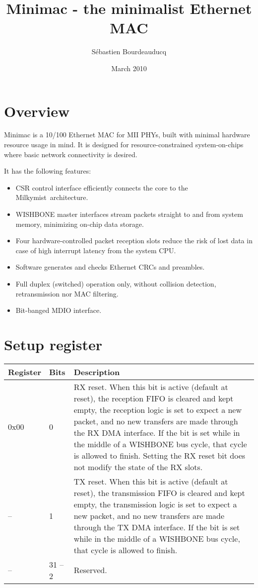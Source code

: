 \documentclass[a4paper,11pt]{article}
\title{Minimac - the minimalist Ethernet MAC}
\author{S\'ebastien Bourdeauducq}
\date{March 2010}
\begin{document}
\setlength{\parindent}{0pt}
\setlength{\parskip}{5pt}
\maketitle{}
\section{Overview}
Minimac is a 10/100 Ethernet MAC for MII PHYs, built with minimal hardware resource usage in mind. It is designed for resource-constrained system-on-chips where basic network connectivity is desired.

It has the following features:
\begin{itemize}
\item CSR control interface efficiently connects the core to the Milkymist\texttrademark~architecture.
\item WISHBONE master interfaces stream packets straight to and from system memory, minimizing on-chip data storage.
\item Four hardware-controlled packet reception slots reduce the risk of lost data in case of high interrupt latency from the system CPU.
\item Software generates and checks Ethernet CRCs and preambles.
\item Full duplex (switched) operation only, without collision detection, retransmission nor MAC filtering.
\item Bit-banged MDIO interface.
\end{itemize}

\section{Setup register}

\begin{tabularx}{450pt}{|l|l|X|}
\hline
\textbf{Register} & \textbf{Bits} & \textbf{Description} \\
\hline
0x00 & 0 & RX reset. When this bit is active (default at reset), the reception FIFO is cleared and kept empty, the reception logic is set to expect a new packet, and no new transfers are made through the RX DMA interface. If the bit is set while in the middle of a WISHBONE bus cycle, that cycle is allowed to finish. Setting the RX reset bit does not modify the state of the RX slots. \\
\hline
-- & 1 & TX reset. When this bit is active (default at reset), the transmission FIFO is cleared and kept empty, the transmission logic is set to expect a new packet, and no new transfers are made through the TX DMA interface. If the bit is set while in the middle of a WISHBONE bus cycle, that cycle is allowed to finish. \\
\hline
-- & 31 -- 2 & Reserved. \\
\hline
\end{tabularx}
\end{document}
